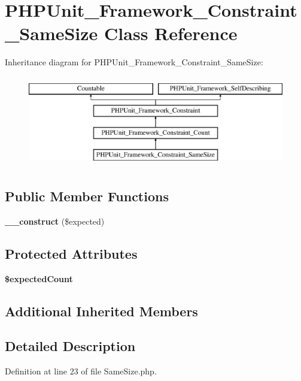 \section{P\+H\+P\+Unit\+\_\+\+Framework\+\_\+\+Constraint\+\_\+\+Same\+Size Class Reference}
\label{class_p_h_p_unit___framework___constraint___same_size}
Inheritance diagram for P\+H\+P\+Unit\+\_\+\+Framework\+\_\+\+Constraint\+\_\+\+Same\+Size\+:\begin{figure}[H]
\begin{center}
\leavevmode
\includegraphics[height=4.000000cm]{class_p_h_p_unit___framework___constraint___same_size}
\end{center}
\end{figure}
\subsection*{Public Member Functions}
\begin{DoxyCompactItemize}
\item 
{\bf \+\_\+\+\_\+construct} (\$expected)
\end{DoxyCompactItemize}
\subsection*{Protected Attributes}
\begin{DoxyCompactItemize}
\item 
{\bf \$expected\+Count}
\end{DoxyCompactItemize}
\subsection*{Additional Inherited Members}


\subsection{Detailed Description}


Definition at line 23 of file Same\+Size.\+php.



